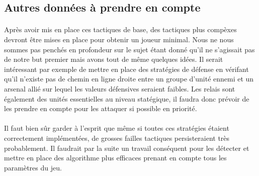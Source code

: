 		\subsection{Autres données à prendre en compte}
		
		\paragraph{}
		Après avoir mis en place ces tactiques de base, des tactiques plus compèxes devront être mises en place pour obtenir un joueur minimal.
		Nous ne nous sommes pas penchés en profondeur sur le sujet étant donné qu'il ne s'agissait pas de notre but premier mais avons tout de même quelques idées.
		Il serait intéressant par exemple de mettre en place des stratégies de défense en vérifant qu'il n'existe pas de chemin en ligne droite entre un groupe
		d'unité ennemi et un arsenal allié sur lequel les valeurs défensives seraient faibles.
		Les relais sont également des unités essentielles au niveau statégique, il faudra donc prévoir de les prendre en compte pour les attaquer si possible
		en priorité.
		
		\paragraph{}
		Il faut bien sûr garder à l'esprit que même si toutes ces stratégies étaient correctement implémentées, de grosses failles tactiques persisteraient
		très probablement. Il faudrait par la suite un travail conséquent pour les détecter et mettre en place des algorithme plus efficaces prenant en compte
		tous les paramètres du jeu.
		

	
